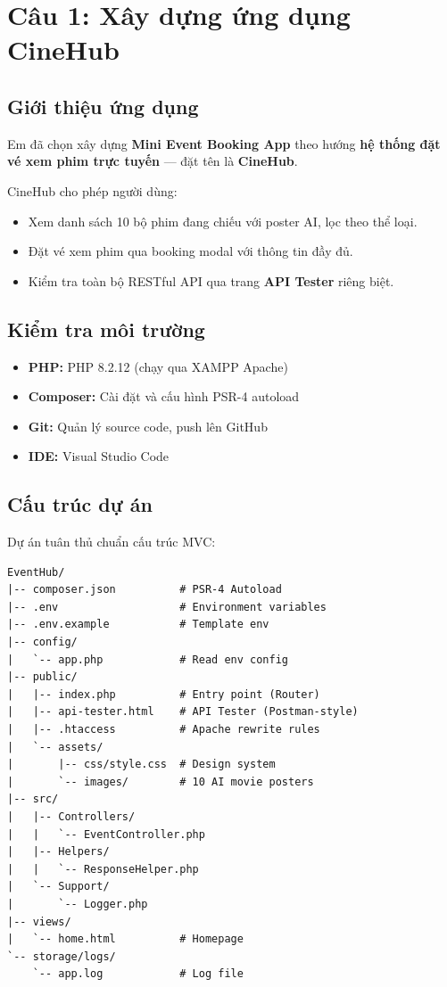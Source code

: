 \documentclass[12pt,a4paper]{article}
\begin{document}
\tableofcontents
\newpage

\section{Câu 1: Xây dựng ứng dụng CineHub}

\subsection{Giới thiệu ứng dụng}

Em đã chọn xây dựng \textbf{Mini Event Booking App} theo hướng \textbf{hệ thống đặt vé xem phim trực tuyến} — đặt tên là \textbf{CineHub}.

CineHub cho phép người dùng:
\begin{itemize}[noitemsep]
    \item Xem danh sách 10 bộ phim đang chiếu với poster AI, lọc theo thể loại.
    \item Đặt vé xem phim qua booking modal với thông tin đầy đủ.
    \item Kiểm tra toàn bộ RESTful API qua trang \textbf{API Tester} riêng biệt.
\end{itemize}

\subsection{Kiểm tra môi trường}

\begin{itemize}[noitemsep]
    \item \textbf{PHP:} PHP 8.2.12 (chạy qua XAMPP Apache)
    \item \textbf{Composer:} Cài đặt và cấu hình PSR-4 autoload
    \item \textbf{Git:} Quản lý source code, push lên GitHub
    \item \textbf{IDE:} Visual Studio Code
\end{itemize}

\subsection{Cấu trúc dự án}

Dự án tuân thủ chuẩn cấu trúc MVC:

\begin{verbatim}
EventHub/
|-- composer.json          # PSR-4 Autoload
|-- .env                   # Environment variables
|-- .env.example           # Template env
|-- config/
|   `-- app.php            # Read env config
|-- public/
|   |-- index.php          # Entry point (Router)
|   |-- api-tester.html    # API Tester (Postman-style)
|   |-- .htaccess          # Apache rewrite rules
|   `-- assets/
|       |-- css/style.css  # Design system
|       `-- images/        # 10 AI movie posters
|-- src/
|   |-- Controllers/
|   |   `-- EventController.php
|   |-- Helpers/
|   |   `-- ResponseHelper.php
|   `-- Support/
|       `-- Logger.php
|-- views/
|   `-- home.html          # Homepage
`-- storage/logs/
    `-- app.log            # Log file
\end{verbatim}
\end{document}
